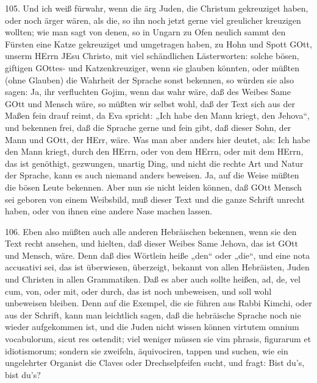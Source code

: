 105. Und ich weiß fürwahr, wenn die ärg
Juden, die Christum gekreuziget haben, oder noch ärger wären, als die, so ihn noch jetzt gerne viel greulicher kreuzigen wollten; wie man sagt von denen, so in Ungarn zu Ofen neulich sammt den Fürsten eine Katze gekreuziget und umgetragen haben, zu Hohn und Spott GOtt, unserm HErrn JEsu Christo, mit viel schändlichen Lästerworten: solche bösen, giftigen GOttes- und Katzenkreuziger, wenn sie glauben könnten, oder müßten (ohne Glauben) die Wahrheit der Sprache sonst bekennen, so würden sie also sagen: Ja, ihr verfluchten Gojim, wenn das wahr wäre, daß des Weibes Same GOtt und Mensch wäre, so müßten wir selbst wohl, daß der Text sich aus der Maßen fein drauf reimt, da Eva spricht: „Ich habe den Mann kriegt, den Jehova“, und bekennen frei, daß die Sprache gerne und fein gibt, daß dieser Sohn, der Mann und GOtt, der HErr, wäre. Was man aber anders hier deutet, als: Ich habe den Mann kriegt, durch den HErrn, oder von dem HErrn, oder mit dem HErrn, das ist genöthigt, gezwungen, unartig Ding, und nicht die rechte Art und Natur der Sprache, kann es auch niemand anders beweisen. Ja, auf die Weise müßten die bösen Leute bekennen. Aber nun sie nicht leiden können, daß GOtt Mensch sei geboren von einem Weibsbild, muß dieser Text und die ganze Schrift unrecht haben, oder von ihnen eine andere Nase machen lassen.

106. Eben also müßten auch alle anderen Hebräischen bekennen, wenn sie den Text recht ansehen, und hielten, daß dieser Weibes Same Jehova, das ist GOtt und Mensch, wäre. Denn daß dies Wörtlein  heiße „den“ oder „die“, und eine nota accusativi sei, das ist überwiesen, überzeigt, bekannt von allen Hebräisten, Juden und Christen in allen Grammatiken. Daß es aber auch sollte heißen, ad, de, vel cum, von, oder mit, oder durch, das ist noch unbeweisen, und soll wohl unbeweisen bleiben. Denn auf die Exempel, die sie führen aus Rabbi Kimchi, oder aus der Schrift, kann man leichtlich sagen, daß die hebräische Sprache noch nie wieder aufgekommen ist, und die Juden nicht wissen können virtutem omnium vocabulorum, sicut res ostendit; viel weniger müssen sie vim phrasis, figurarum et idiotismorum; sondern sie zweifeln, äquivociren, tappen und suchen, wie ein ungelehrter Organist die Claves oder Drechselpfeifen sucht, und fragt: Bist du’s, bist du’s?

